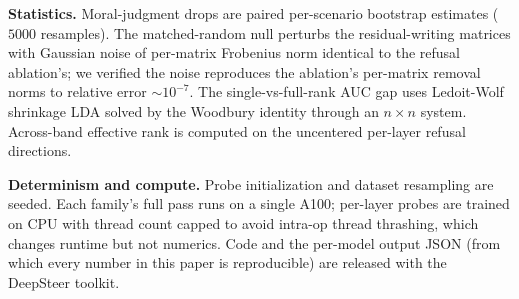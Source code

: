 \textbf{Statistics.} Moral-judgment drops are paired per-scenario bootstrap estimates
(\(5000\) resamples). The matched-random null perturbs the residual-writing matrices
with Gaussian noise of per-matrix Frobenius norm identical to the refusal
ablation's; we verified the noise reproduces the ablation's per-matrix removal
norms to relative error \(\sim 10^{-7}\). The single-vs-full-rank AUC gap uses
Ledoit-Wolf shrinkage LDA solved by the Woodbury identity through an
\(n \times n\) system. Across-band effective rank is computed on the uncentered
per-layer refusal directions.

\textbf{Determinism and compute.} Probe initialization and dataset resampling are
seeded. Each family's full pass runs on a single A100; per-layer probes are
trained on CPU with thread count capped to avoid intra-op thread thrashing, which
changes runtime but not numerics. Code and the per-model output JSON (from which
every number in this paper is reproducible) are released with the DeepSteer
toolkit.
